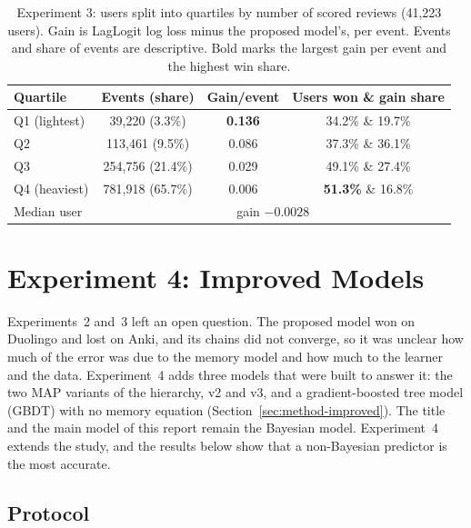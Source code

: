 \begin{table}[t]
  \centering
  \small
  \caption[Experiment 3: gain by user volume]{Experiment 3: users split into quartiles by number of scored reviews (41,223
    users). Gain is LagLogit log loss minus the proposed model's, per event. Events and share of events are descriptive.
    Bold marks the largest gain per event and the highest win share.}
  \label{tab:exp3-quartiles}
  \begin{tabular}{@{}lccc@{}}
    \toprule
    Quartile & Events (share) & Gain/event & Users won \& gain share \\
    \midrule
    Q1 (lightest) & 39,220 (3.3\%) & \textbf{0.136} & 34.2\% \& 19.7\% \\
    Q2 & 113,461 (9.5\%) & 0.086 & 37.3\% \& 36.1\% \\
    Q3 & 254,756 (21.4\%) & 0.029 & 49.1\% \& 27.4\% \\
    Q4 (heaviest) & 781,918 (65.7\%) & 0.006 & \textbf{51.3\%} \& 16.8\% \\
    \midrule
    Median user & \multicolumn{3}{c}{gain $-0.0028$} \\
    \bottomrule
  \end{tabular}
\end{table}

\section{Experiment 4: Improved Models}
\label{sec:results-exp4}

Experiments~2 and~3 left an open question. The proposed model won on Duolingo and lost on Anki, and its
chains did not converge, so it was unclear how much of the error was due to the memory model and how much to
the learner and the data. Experiment~4 adds three models that were built to answer it: the two MAP variants of the
hierarchy, v2 and v3, and a gradient-boosted tree model (GBDT) with no memory equation
(Section~\ref{sec:method-improved}). The title and the main model of this report remain the Bayesian model. Experiment~4
extends the study, and the results below show that a non-Bayesian predictor is the most accurate.

\subsection{Protocol}
\label{sec:results-exp4-protocol}

